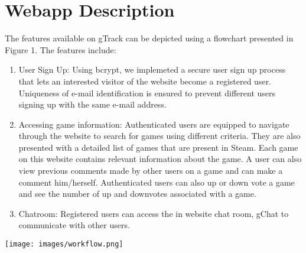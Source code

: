 \chapter{Webapp Description}

The features available on gTrack can be depicted using a flowchart presented in Figure 1. The features include:

\begin{enumerate}
	\item User Sign Up: Using bcrypt, we implemeted a secure user sign up process that lets an interested visitor of the website become a registered user. Uniqueness of e-mail identification is ensured to prevent different users signing up with the same e-mail address.
	\item Accessing game information: Authenticated users are equipped to navigate through the website to search for games using different criteria. They are also presented with a detailed list of games that are present in Steam. Each game on this website contains relevant information about the game. A user can also view previous comments made by other users on a game and can make a comment him/herself. Authenticated users can also up or down vote a game and see the number of up and downvotes associated with a game.
	\item Chatroom: Registered users can access the in website chat room, gChat to communicate with other users.
\end{enumerate}

\begin {figure*}
\centering
\texttt{[image: images/workflow.png]}   
\caption{\textsf{gTrack Flowchart}}
\end{figure*}
